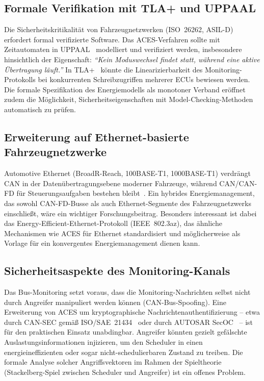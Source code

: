 ﻿\documentclass[a4paper,12pt]{article}
\theoremstyle{definition}
\begin{document}
\subsection{Formale Verifikation mit TLA+ und UPPAAL}

Die Sicherheitskritikalit\"{a}t von Fahrzeugnetzwerken (ISO~26262, ASIL-D)
erfordert formal verifizierte Software.
Das ACES-Verfahren sollte mit Zeitautomaten in UPPAAL~\cite{uppaal} modelliert
und verifiziert werden, insbesondere hinsichtlich der Eigenschaft:
\emph{``Kein Moduswechsel findet statt, w\"{a}hrend eine aktive \"{U}bertragung l\"{a}uft.''}
In TLA+~\cite{lamport_tla} k\"{o}nnte die Linearizierbarkeit des Monitoring-Protokolls
bei konkurrenten Schreibzugriffen mehrerer ECUs bewiesen werden.
Die formale Spezifikation des Energiemodells als monotoner Verband er\"{o}ffnet
zudem die M\"{o}glichkeit, Sicherheitseigenschaften mit Model-Checking-Methoden
automatisch zu pr\"{u}fen.

\subsection{Erweiterung auf Ethernet-basierte Fahrzeugnetzwerke}

Automotive Ethernet (BroadR-Reach, 100BASE-T1, 1000BASE-T1) verdrängt CAN in
der Daten\"{u}bertragungsebene moderner Fahrzeuge, w\"{a}hrend CAN/CAN-FD f\"{u}r
Steuerungsaufgaben bestehen bleibt~\cite{ieee802_3bw}.
Ein hybrides Energiemanagement, das sowohl CAN-FD-Busse als auch
Ethernet-Segmente des Fahrzeugnetzwerks einschlie\ss{}t, w\"{a}re ein wichtiger
Forschungsbeitrag.
Besonders interessant ist dabei das Energy-Efficient-Ethernet-Protokoll (IEEE~802.3az),
das \"{a}hnliche Mechanismen wie ACES f\"{u}r Ethernet standardisiert und
m\"{o}glicherweise als Vorlage f\"{u}r ein konvergentes Energiemanagement
dienen kann.

\subsection{Sicherheitsaspekte des Monitoring-Kanals}

Das Bus-Monitoring setzt voraus, dass die Monitoring-Nachrichten selbst nicht
durch Angreifer manipuliert werden k\"{o}nnen (CAN-Bus-Spoofing).
Eine Erweiterung von ACES um kryptographische Nachrichtenauthentifizierung
-- etwa durch CAN-SEC gem\"{a}\ss{} ISO/SAE~21434~\cite{iso21434}
oder durch AUTOSAR SecOC~\cite{autosar_secoc} -- ist f\"{u}r den praktischen Einsatz
unabdingbar.
Angreifer k\"{o}nnten gezielt gef\"{a}lschte Auslastungsinformationen
injizieren, um den Scheduler in einen energieineffizienten oder sogar
nicht-schedulierbaren Zustand zu treiben.
Die formale Analyse solcher Angriffsvektoren im Rahmen der Spieltheorie
(Stackelberg-Spiel zwischen Scheduler und Angreifer) ist ein offenes Problem.
\end{document}
